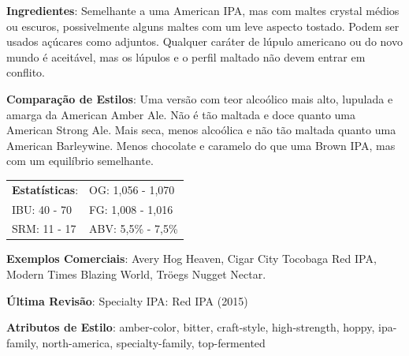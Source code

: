 \textbf{Ingredientes}: Semelhante a uma American IPA, mas com maltes crystal médios ou escuros, possivelmente alguns maltes com um leve aspecto tostado. Podem ser usados açúcares como adjuntos. Qualquer caráter de lúpulo americano ou do novo mundo é aceitável, mas os lúpulos e o perfil maltado não devem entrar em conflito.

\textbf{Comparação de Estilos}: Uma versão com teor alcoólico mais alto, lupulada e amarga da American Amber Ale. Não é tão maltada e doce quanto uma American Strong Ale. Mais seca, menos alcoólica e não tão maltada quanto uma American Barleywine. Menos chocolate e caramelo do que uma Brown IPA, mas com um equilíbrio semelhante.

\begin{tabular}{@{}p{35mm}p{35mm}@{}}
  \textbf{Estatísticas}: & OG: 1,056 - 1,070 \\
  IBU: 40 - 70  & FG: 1,008 - 1,016 \\
  SRM: 11 - 17  & ABV: 5,5\% - 7,5\%
\end{tabular}

\textbf{Exemplos Comerciais}: Avery Hog Heaven, Cigar City Tocobaga Red IPA, Modern Times Blazing World, Tröegs Nugget Nectar.

\textbf{Última Revisão}: Specialty IPA: Red IPA (2015)

\textbf{Atributos de Estilo}: amber-color, bitter, craft-style, high-strength, hoppy, ipa-family, north-america, specialty-family, top-fermented
